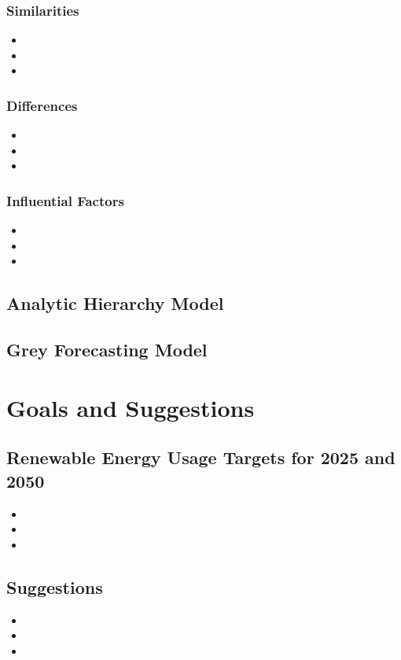 \documentclass{mcmthesis}
\begin{document}
 \subsubsection{Similarities}
 \begin{itemize}
 	\item
 	\item
 	\item
 \end{itemize}
 \subsubsection{Differences}
 \begin{itemize}
 	\item
 	\item
 	\item
 \end{itemize}
 \subsubsection{Influential Factors}
 \begin{itemize}
 	\item
 	\item
 	\item
 \end{itemize}

\subsection{Analytic Hierarchy Model}

\subsection{Grey Forecasting Model}


\section{Goals and Suggestions}
%
\subsection{Renewable Energy Usage Targets for 2025 and 2050}
\begin{itemize}
 	\item
 	\item
 	\item
 \end{itemize}
\subsection{Suggestions}
\begin{itemize}
 	\item
 	\item
 	\item
 \end{itemize}
\end{document}
